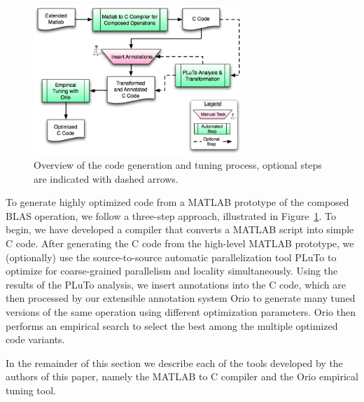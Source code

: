 \documentclass[runningheads]{llncs}
\begin{document}



\begin{figure}[htbp]
\centering
\includegraphics[width=0.7\textwidth]{figures/process.png}
\caption{Overview of the code generation and tuning process, optional steps are indicated with dashed arrows.}
\label{fig:process}
\end{figure}
To generate highly optimized code from a MATLAB prototype of the composed BLAS operation, we follow a three-step approach, illustrated in Figure~\ref{fig:process}.  To begin, we have developed a compiler that converts a MATLAB script into simple C code.
After generating the C code from the high-level MATLAB prototype, we (optionally) use the source-to-source automatic parallelization tool PLuTo\cite{Pluto} %
to optimize for coarse-grained parallelism and locality simultaneously. Using the results of the PLuTo analysis, we insert annotations into the C code, which are then processed by our extensible annotation system Orio to generate many tuned versions of the same operation using different optimization parameters. Orio then performs an empirical search to select the best among the multiple optimized code variants.


In the remainder of this section we describe each of the tools developed by the authors of this paper, namely the MATLAB to C compiler and the Orio empirical tuning tool.
\end{document}
